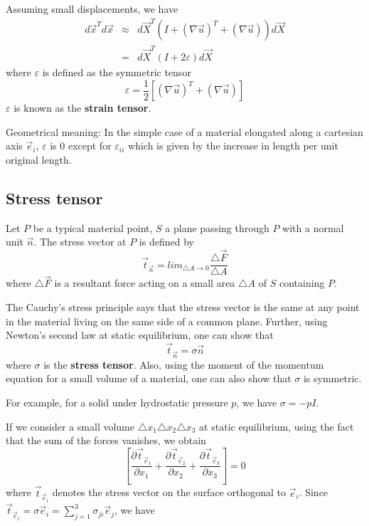 %
Assuming small displacements, we have
%
\begin{eqnarray}
  d\vec x^T d\vec x&\approx &d\vec X^T \left(
  I+(\nabla\vec u)^T+(\nabla\vec u)
  \right) d\vec X \nonumber \\
  &=&
  d\vec X^T (I+2\varepsilon) d\vec X
\end{eqnarray}
%
where $\varepsilon$ is defined as the symmetric tensor
%
\begin{equation}
  \varepsilon=\frac{1}{2}\left[(\nabla\vec u)^T+(\nabla\vec u)\right]
\end{equation}
%
$\varepsilon$ is known as the {\bf strain tensor}.

Geometrical meaning: In the simple case of a material elongated along
a cartesian axis $\vec e_i$, $\varepsilon$ is $0$ except for
$\varepsilon_{ii}$ which is given by the increase in length per unit
original length.


\subsection{Stress tensor}

Let $P$ be a typical material point, $S$ a plane passing through $P$
with a normal unit $\vec n$.  The stress vector at $P$ is defined by
%
\begin{equation}
  \vec t_{\vec n}=lim_{\triangle A\rightarrow 0}\frac{\triangle\vec F}{\triangle A}
\end{equation}
%
where $\triangle\vec F$ is a resultant force acting on a small area
$\triangle A$ of $S$ containing $P$.

The Cauchy's stress principle says that the stress vector is the same
at any point in the material living on the same side of a common
plane.  Further, using Newton's second law at static equilibrium, one
can show that
%
\begin{equation}\label{eq:stress_tensor}
  \vec t_{\vec n}=\sigma\vec n
\end{equation}
%
where $\sigma$ is the {\bf stress tensor}.  Also, using the moment of
the momentum equation for a small volume of a material, one can also
show that $\sigma$ is symmetric.

For example, for a solid under hydrostatic pressure $p$, we have
$\sigma=-p I$.

If we consider a small volume $\triangle x_1 \triangle x_2 \triangle
x_3$ at static equilibrium, using the fact that the sum of the forces
vanishes, we obtain
%
\begin{equation}
  \left[\frac{\partial\vec t_{\vec e_1}}{\partial x_1}+ \frac{\partial\vec t_{\vec e_2}}{\partial x_2} + \frac{\partial\vec t_{\vec e_3}}{\partial x_3} \right]=0
\end{equation}
%
where $\vec t_{\vec e_i}$ denotes the stress vector on the surface
orthogonal to $\vec e_i$.  Since $\vec t_{\vec e_i}=\sigma\vec
e_i=\sum_{j=1}^3 \sigma_{ji}\vec e_j$, we have

